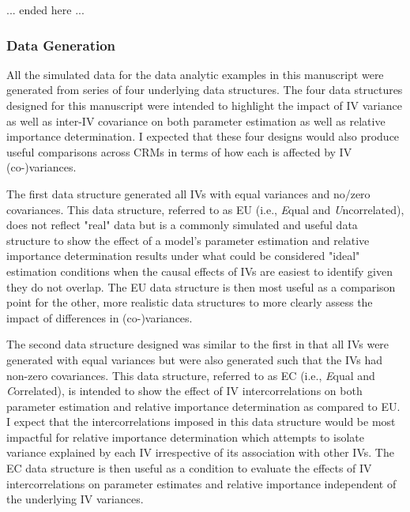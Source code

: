 \documentclass[ShortAfour,times,sageapa]{sagej}
\begin{document}
	
	... ended here ...
	
		\subsubsection{Data Generation}
	
	All the simulated data for the data analytic examples in this manuscript were generated from series of four underlying data structures.
	The four data structures designed for this manuscript were intended to highlight the impact of IV variance as well as inter-IV covariance on both parameter estimation as well as relative importance determination.
	I expected that these four designs would also produce useful comparisons across CRMs in terms of how each is affected by IV (co-)variances.
	
	The first data structure generated all IVs with equal variances and no/zero covariances.  
	This data structure, referred to as EU (i.e., \emph{E}qual and \emph{U}ncorrelated), does not reflect "real" data but is a commonly simulated and useful data structure to show the effect of a model's parameter estimation and relative importance determination results under what could be considered "ideal" estimation conditions when the causal effects of IVs are easiest to identify given they do not overlap.  
	The EU data structure is then most useful as a comparison point for the other, more realistic data structures to more clearly assess the impact of differences in (co-)variances.
	
	The second data structure designed was similar to the first in that all IVs were generated with equal variances but were also generated such that the IVs had non-zero covariances. 
	This data structure, referred to as EC (i.e., \emph{E}qual and \emph{C}orrelated), is intended to show the effect of IV intercorrelations on both parameter estimation and relative importance determination as compared to EU.  
	I expect that the intercorrelations imposed in this data structure would be most impactful for relative importance determination which attempts to isolate variance explained by each IV irrespective of its association with other IVs.
	The EC data structure is then useful as a condition to evaluate the effects of IV intercorrelations on parameter estimates and relative importance independent of the underlying IV variances.
	
\end{document}
